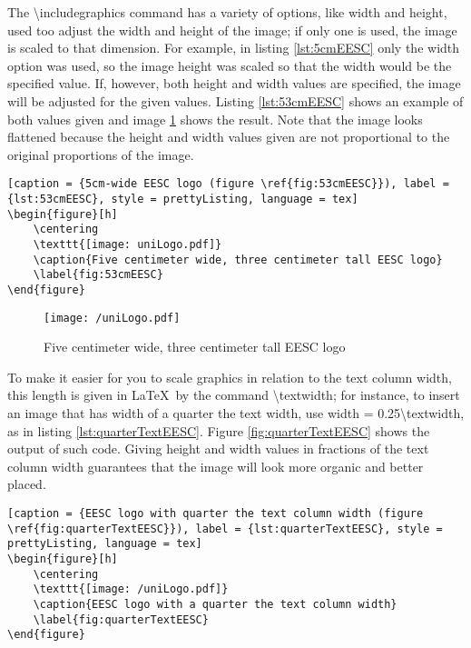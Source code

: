 	The  {\ttfamily\small \textbackslash includegraphics} command has a variety of options, like {\ttfamily\small width} and {\ttfamily\small height}, used too adjust the width and height of the image; if only one is used, the image is scaled to that dimension. For example, in listing \ref{lst:5cmEESC} only the width option was used, so the image height was scaled so that the width would be the specified value. If, however, both height and width values are specified, the image will be adjusted for the given values. Listing \ref{lst:53cmEESC} shows an example of both values given and image \ref{fig:53cmEESC} shows the result. Note that the image looks flattened because the height and width values given are not proportional to the original proportions of the image.

\begin{lstlisting}[caption = {5cm-wide EESC logo (figure \ref{fig:53cmEESC}}), label = {lst:53cmEESC}, style = prettyListing, language = tex]
\begin{figure}[h]
	\centering
	\texttt{[image: uniLogo.pdf]}
	\caption{Five centimeter wide, three centimeter tall EESC logo}
	\label{fig:53cmEESC}
\end{figure}
\end{lstlisting}

\begin{figure}[h]
	\centering
	\texttt{[image: /uniLogo.pdf]}
	\caption{Five centimeter wide, three centimeter tall EESC logo}
	\label{fig:53cmEESC}
\end{figure}

	To make it easier for you to scale graphics in relation to the text column width, this length is given in \LaTeX\ by the command {\ttfamily\small \textbackslash textwidth}; for instance, to insert an image that has width of a quarter the text width, use {\ttfamily\small width = 0.25\textbackslash textwidth}, as in listing \ref{lst:quarterTextEESC}. Figure \ref{fig:quarterTextEESC} shows the output of such code. Giving height and width values in fractions of the text column width guarantees that the image will look more organic and better placed.

\begin{lstlisting}[caption = {EESC logo with quarter the text column width (figure \ref{fig:quarterTextEESC}}), label = {lst:quarterTextEESC}, style = prettyListing, language = tex]
\begin{figure}[h]
	\centering
	\texttt{[image: /uniLogo.pdf]}
	\caption{EESC logo with a quarter the text column width}
	\label{fig:quarterTextEESC}
\end{figure}
\end{lstlisting}

